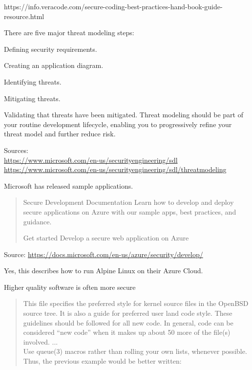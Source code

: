 \documentclass[Screen16to9,17pt]{foils}
\begin{document}
{https://info.veracode.com/secure-coding-best-practices-hand-book-guide-resource.html}



There are five major threat modeling steps:
\begin{list2}
\item Defining security requirements.
\item Creating an application diagram.
\item Identifying threats.
\item Mitigating threats.
\item Validating that threats have been mitigated.
Threat modeling should be part of your routine development lifecycle, enabling you to progressively refine your threat model and further reduce risk.
\end{list2}

Sources:\\
\url{https://www.microsoft.com/en-us/securityengineering/sdl}\\
\url{https://www.microsoft.com/en-us/securityengineering/sdl/threatmodeling}



Microsoft has released sample applications.

\begin{quote}
Secure Development Documentation
Learn how to develop and deploy secure applications on Azure with our sample apps, best practices, and guidance.

Get started
Develop a secure web application on Azure
\end{quote}

Source:
\url{https://docs.microsoft.com/en-us/azure/security/develop/}

Yes, this describes how to run Alpine Linux on their Azure Cloud.



\centerline{Higher quality software is often more secure}


\begin{quote}
This file specifies the preferred style for kernel source files in the
OpenBSD source tree.  It is also a guide for preferred user land code
style.  These guidelines should be followed for all new code.  In general,
code can be considered ``new code'' when it makes up about 50%
more of the file(s) involved. ...\\
Use queue(3) macros rather than rolling your own lists, whenever possible.
Thus, the previous example would be better written:
\end{quote}
\end{document}
